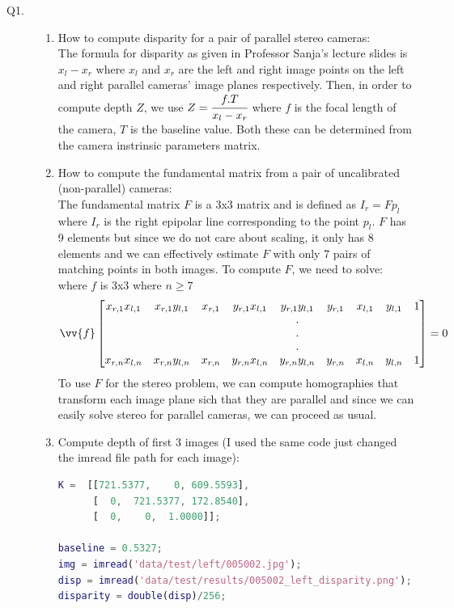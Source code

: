 \documentclass{csc_assignment4}
\begin{document}
\begin{description}

\item[Q1.]
\begin{enumerate}[label=(\alph*)]
\item How to compute disparity for a pair of parallel stereo cameras:\\ The formula for disparity as given in Professor Sanja's lecture slides is $x_{l} - x_{r}$ where $x_{l}$ and $x_{r}$ are the left and right image points on the left and right parallel cameras' image planes respectively. Then, in order to compute depth $Z$, we use $Z = \cfrac{f . T}{x_{l} - x_{r}}$ where $f$ is the focal length of the camera, $T$ is the baseline value. Both these can be determined from the camera instrinsic parameters matrix. 
\item How to compute the fundamental matrix from a pair of uncalibrated (non-parallel) cameras:\\ The fundamental matrix $F$ is a 3x3 matrix and is defined as $I_{r} = Fp_{l}$ where $I_{r}$ is the right epipolar line corresponding to the point $p_{l}$. $F$ has 9 elements but since we do not care about scaling, it only has 8 elements and we can effectively estimate $F$ with only 7 pairs of matching points in both images. To compute $F$, we need to solve: where $f$ is 3x3 where $n \ge 7$
\[
  \vv{f}
  \begin{bmatrix}
	x_{r, 1}x_{l, 1} & x_{r, 1}y_{l, 1} & x_{r, 1} & y_{r,1}x_{l,1} & y_{r,1}y_{l,1} & y_{r,1} & x_{l,1} & y_{l,1} & 1\\
	& & & & . & & &\\
	& & & & . & & &\\
	& & & & . & & &\\
	x_{r, n}x_{l, n} & x_{r, n}y_{l, n} & x_{r, n} & y_{r,n}x_{l,n} & y_{r,n}y_{l,n} & y_{r,n} & x_{l,n} & y_{l,n} & 1
  \end{bmatrix}
  = 0
\]
To use $F$ for the stereo problem, we can compute homographies that transform each image plane sich that they are parallel and since we can easily solve stereo for parallel cameras, we can proceed as usual. 
\item Compute depth of first 3 images (I used the same code just changed the imread file path for each image): \\
\begin{lstlisting}[language=MATLAB]
K =  [[721.5377,    0, 609.5593],
      [  0,  721.5377, 172.8540],
      [  0,    0,  1.0000]];
  
baseline = 0.5327;
img = imread('data/test/left/005002.jpg');
disp = imread('data/test/results/005002_left_disparity.png');
disparity = double(disp)/256;


\end{lstlisting}
\end{enumerate}
\end{description}
\end{document}
